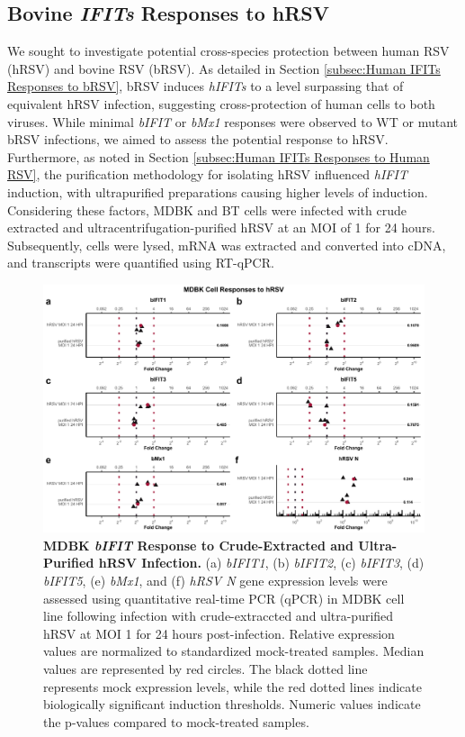 \subsection{Bovine \textit{IFITs} Responses to hRSV} \label{subsec:Bovine IFITs Responses to hRSV}
We sought to investigate potential cross-species protection between human RSV (hRSV) and bovine RSV (bRSV). As detailed in Section \ref{subsec:Human IFITs Responses to bRSV}, bRSV induces \textit{hIFITs} to a level surpassing that of equivalent hRSV infection, suggesting cross-protection of human cells to both viruses. While minimal \textit{bIFIT} or \textit{bMx1} responses were observed to WT or mutant bRSV infections, we aimed to assess the potential response to hRSV. Furthermore, as noted in Section \ref{subsec:Human IFITs Responses to Human RSV}, the purification methodology for isolating hRSV influenced \textit{hIFIT} induction, with ultrapurified preparations causing higher levels of induction. Considering these factors, MDBK and BT cells were infected with crude extracted and ultracentrifugation-purified hRSV at an MOI of 1 for 24 hours. Subsequently, cells were lysed, mRNA was extracted and converted into cDNA, and transcripts were quantified using RT-qPCR.

\begin{figure}
    \centering
    \includegraphics[width=1\linewidth]{07. Chapter 2/Figs/02. Induction/07. mdbk_hrsv.pdf}
    \caption[MDBK \textit{bIFIT} Response to Crude-Extracted and Ultra-Purified hRSV Infection.]{\textbf{MDBK \textit{bIFIT} Response to Crude-Extracted and Ultra-Purified hRSV Infection.} (a) \textit{bIFIT1}, (b) \textit{bIFIT2}, (c) \textit{bIFIT3}, (d) \textit{bIFIT5}, (e) \textit{bMx1}, and (f) \textit{hRSV N} gene expression levels were assessed using quantitative real-time PCR (qPCR) in MDBK cell line following infection with crude-extraccted and ultra-purified hRSV at MOI 1 for 24 hours post-infection. Relative expression values are normalized to standardized mock-treated samples. Median values are represented by red circles. The black dotted line represents mock expression levels, while the red dotted lines indicate biologically significant induction thresholds. Numeric values indicate the p-values compared to mock-treated samples.}
    \label{fig:bIFIT responses to hRSV infection in MDBK}
\end{figure}

